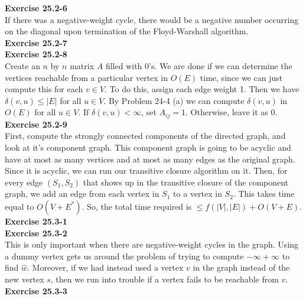 \documentclass{article}
\begin{document}
\noindent\textbf{Exercise 25.2-6}\\

If there was a negative-weight cycle, there would be a negative number occurring on the diagonal upon termination of the Floyd-Warshall algorithm.  \\

\noindent\textbf{Exercise 25.2-7}\\

\noindent\textbf{Exercise 25.2-8}\\

Create an $n$ by $n$ matrix $A$ filled with 0's.  We are done if we can determine the vertices reachable from a particular vertex in $O(E)$ time, since we can just compute this for each $v \in V$. To do this, assign each edge weight 1.  Then we have $\delta(v,u) \leq |E|$ for all $u \in V$.  By Problem 24-4 (a) we can compute $\delta(v,u)$ in $O(E)$ for all $u \in V$.  If $\delta(v,u) < \infty$, set $A_{ij} = 1$.  Otherwise, leave it as 0.  \\

\noindent\textbf{Exercise 25.2-9}\\

First, compute the strongly connected components of the directed graph, and look at it's component graph. This component graph is going to be acyclic and have at most as many vertices and at most as many edges as the original graph. Since it is acyclic, we can run our transitive closure algorithm on it. Then, for every edge $(S_1,S_2)$ that shows up in the transitive closure of the component graph, we add an edge from each vertex in $S_1$ to a vertex in $S_2$. This takes time equal to $O(V+E^*)$. So, the total time required is $\le f(|V|,|E|) + O(V+E)$.\\

\noindent\textbf{Exercise 25.3-1}\\


\noindent\textbf{Exercise 25.3-2}\\

This is only important when there are negative-weight cycles in the graph.  Using a dummy vertex gets us around the problem of trying to compute $-\infty + \infty$ to find $\hat{w}$.   Moreover, if we had instead used a vertex $v$ in the graph instead of the new vertex $s$, then we run into trouble if a vertex fails to be reachable from $v$.\\

\noindent\textbf{Exercise 25.3-3}\\
\end{document}
